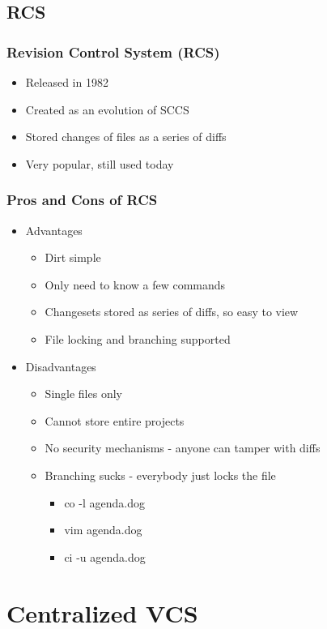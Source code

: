 \documentclass{beamer}
\begin{document}
\subsection{RCS}

\begin{frame}
  \frametitle{Revision Control System (RCS)}
  \begin{itemize}
    \item Released in 1982
    \item Created as an evolution of SCCS
    \item Stored changes of files as a series of diffs
    \item Very popular, still used today
  \end{itemize}
\end{frame}

\begin{frame}
  \frametitle{Pros and Cons of RCS}
  \begin{itemize}
    \item Advantages
      \begin{itemize}
	\item Dirt simple
	\item Only need to know a few commands
	\item Changesets stored as series of diffs, so easy to view
	\item File locking and branching supported
      \end{itemize}
    \item Disadvantages
      \begin{itemize}
	\item Single files only
	\item Cannot store entire projects
	\item No security mechanisms - anyone can tamper with diffs
	\item Branching sucks - everybody just locks the file
	  \begin{itemize}
	    \item co -l agenda.dog
	    \item vim agenda.dog
	    \item ci -u agenda.dog
	  \end{itemize}
      \end{itemize}
  \end{itemize}
\end{frame}

\section{Centralized VCS}
\end{document}
